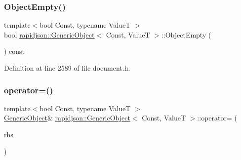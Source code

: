 \mbox{\label{classrapidjson_1_1_generic_object_ad5ad0ae2038d629f17b10b2b11ced58b}} 
\subsubsection{\texorpdfstring{ObjectEmpty()}{ObjectEmpty()}}
{\footnotesize\ttfamily template$<$bool Const, typename ValueT $>$ \\
bool \mbox{\hyperlink{classrapidjson_1_1_generic_object}{rapidjson\+::\+Generic\+Object}}$<$ Const, ValueT $>$\+::Object\+Empty (\begin{DoxyParamCaption}{ }\end{DoxyParamCaption}) const}



Definition at line 2589 of file document.\+h.


\begin{DoxyCode}{0}

\end{DoxyCode}
\mbox{\label{classrapidjson_1_1_generic_object_af94485b6c52b821203fe2c23a92c282f}} 
\subsubsection{\texorpdfstring{operator=()}{operator=()}}
{\footnotesize\ttfamily template$<$bool Const, typename ValueT $>$ \\
\mbox{\hyperlink{classrapidjson_1_1_generic_object}{Generic\+Object}}\& \mbox{\hyperlink{classrapidjson_1_1_generic_object}{rapidjson\+::\+Generic\+Object}}$<$ Const, ValueT $>$\+::operator= (\begin{DoxyParamCaption}\item[{\mbox{\hyperlink{classrapidjson_1_1_generic_object_a3524fcb5f36c034aabd8afa19fc16d9e}{const}} \mbox{\hyperlink{classrapidjson_1_1_generic_object}{Generic\+Object}}$<$ Const, ValueT $>$ \&}]{rhs }\end{DoxyParamCaption})}



